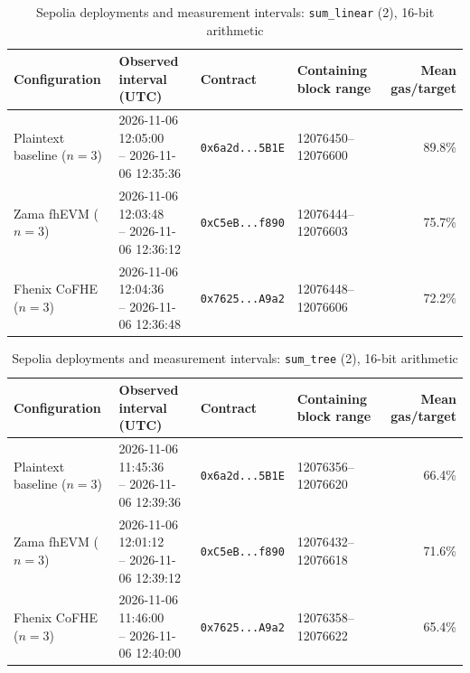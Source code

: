 \begin{table}[!t]
\caption{Sepolia deployments and measurement intervals: \texttt{sum\_linear} (2), 16-bit arithmetic}
\label{tab:sepolia-experiment-deployments-circuits-euint16-circuits-w16-sum-linear-n2}
\centering
\footnotesize
\setlength{\tabcolsep}{4pt}
\begin{tabular}{|l|l|l|l|r|}
\hline
\textbf{Configuration} &
\textbf{Observed interval (UTC)} &
\textbf{Contract} &
\textbf{Containing block range} &
\textbf{Mean gas/target} \\
\hline
Plaintext baseline (\(n=3\)) &
\shortstack[l]{2026-11-06 12:05:00 \\ -- 2026-11-06 12:35:36} &
\texttt{0x6a2d...5B1E} &
12076450--12076600 &
89.8\% \\
\hline
Zama fhEVM (\(n=3\)) &
\shortstack[l]{2026-11-06 12:03:48 \\ -- 2026-11-06 12:36:12} &
\texttt{0xC5eB...f890} &
12076444--12076603 &
75.7\% \\
\hline
Fhenix CoFHE (\(n=3\)) &
\shortstack[l]{2026-11-06 12:04:36 \\ -- 2026-11-06 12:36:48} &
\texttt{0x7625...A9a2} &
12076448--12076606 &
72.2\% \\
\hline
\end{tabular}
\end{table}

\begin{table}[!t]
\caption{Sepolia deployments and measurement intervals: \texttt{sum\_tree} (2), 16-bit arithmetic}
\label{tab:sepolia-experiment-deployments-circuits-euint16-circuits-w16-sum-tree-n2}
\centering
\footnotesize
\setlength{\tabcolsep}{4pt}
\begin{tabular}{|l|l|l|l|r|}
\hline
\textbf{Configuration} &
\textbf{Observed interval (UTC)} &
\textbf{Contract} &
\textbf{Containing block range} &
\textbf{Mean gas/target} \\
\hline
Plaintext baseline (\(n=3\)) &
\shortstack[l]{2026-11-06 11:45:36 \\ -- 2026-11-06 12:39:36} &
\texttt{0x6a2d...5B1E} &
12076356--12076620 &
66.4\% \\
\hline
Zama fhEVM (\(n=3\)) &
\shortstack[l]{2026-11-06 12:01:12 \\ -- 2026-11-06 12:39:12} &
\texttt{0xC5eB...f890} &
12076432--12076618 &
71.6\% \\
\hline
Fhenix CoFHE (\(n=3\)) &
\shortstack[l]{2026-11-06 11:46:00 \\ -- 2026-11-06 12:40:00} &
\texttt{0x7625...A9a2} &
12076358--12076622 &
65.4\% \\
\hline
\end{tabular}
\end{table}

